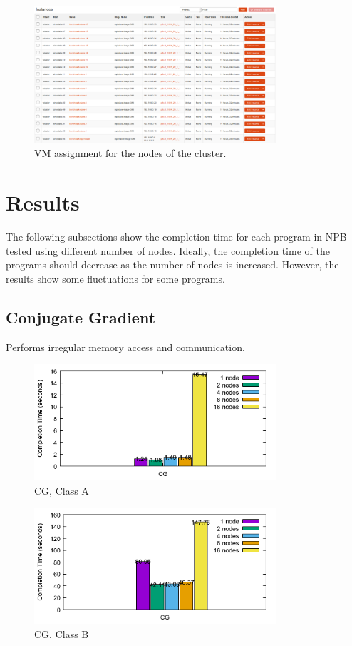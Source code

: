 \documentclass[a4paper]{article}
\begin{document}
\begin{figure}[H]
\centering
\includegraphics[width=0.8\textwidth]{figures/vcluster-vm-assignment.png}
\caption{\label{fig:vmassignment} VM assignment for the nodes of the cluster.}
\end{figure}



\section{Results}

The following subsections show the completion time for each program in NPB tested using different number of nodes. Ideally, the completion time of the programs should decrease as the number of nodes is increased. However, the results show some fluctuations for some programs. 

\subsection{Conjugate Gradient}

Performs irregular memory access and communication.

\begin{figure}[H]
\centering
\includegraphics[width=0.8\textwidth]{figures/CGvA.png}
\caption{\label{fig:CGvA}CG, Class A}
\end{figure}

\begin{figure}[H]
\centering
\includegraphics[width=0.8\textwidth]{figures/CGvB.png}
\caption{\label{fig:CGvB}CG, Class B}
\end{figure}
\end{document}
